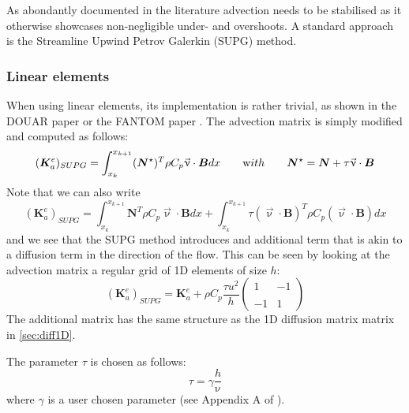 As abondantly documented in the literature advection needs to be stabilised
as it otherwise showcases non-negligible under- and overshoots.
A standard approach is the Streamline Upwind Petrov Galerkin (SUPG) method.

\Literature \cite{brhu82}\cite{humm86}

\subsubsection{Linear elements}

When using linear elements, its implementation is rather trivial, as shown in 
the DOUAR paper \cite{brtf08} or the FANTOM paper \cite{thie11}. 
The advection matrix is simply modified and computed as follows:
\[
({\bm K}_a^e)_{SUPG}
=
\int_{x_k}^{x_{k+1}}   ({\bm N}^\star)^T \rho C_p \vec\upnu \cdot {\bm B} dx  
\quad\quad
{\text with}
\quad\quad
{\bm N}^\star= {\bm N} + \tau \vec \upnu \cdot {\bm B}
\]
Note that we can also write 
\[
({\bm K}_a^e)_{SUPG}
=
\int_{x_k}^{x_{k+1}}   {\bm N}^T \rho C_p \vec\upnu \cdot {\bm B} dx  
+
\int_{x_k}^{x_{k+1}}  \tau (\vec \upnu \cdot {\bm B})^T   \rho C_p (\vec\upnu \cdot {\bm B}) dx  
\]
and we see that the SUPG method introduces and additional term that is akin to 
a diffusion term in the direction of the flow.
This can be seen by looking at the advection matrix a regular grid of 1D 
elements of size $h$:
\[
({\bm K}_a^e)_{SUPG}=
{\bm K}_a^e
+
\rho C_p
\frac{\tau u^2}{h}
\left(
\begin{array}{cc}
1 & -1 \\ \\
-1 & 1
\end{array}
\right)
\]
The additional matrix has the same structure as the 1D diffusion matrix matrix in \ref{sec:diff1D}.

The parameter $\tau$ is chosen as follows:
\begin{equation}
\tau=\gamma \frac{h}{\upnu} 
\label{tausupg}
\end{equation}
where $\gamma$ is a user chosen parameter (see Appendix A of \cite{thie11}). 

